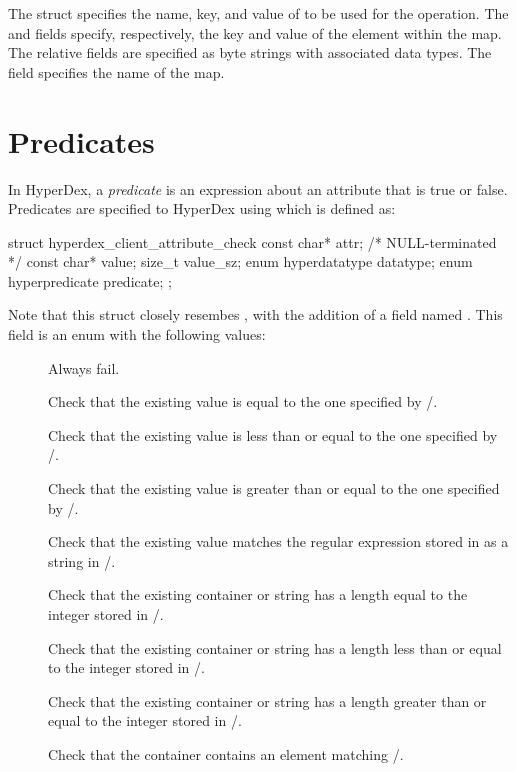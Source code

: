 The struct specifies the name, key, and value of to be used for the operation.
The  and  fields specify, respectively, the key
and value of the element within the map.  The relative fields are specified as
byte strings with associated data types.  The  field specifies the
name of the map.

\section{Predicates}
\label{sec:api:c:client:predicates}

In HyperDex, a {\em predicate} is an expression about an attribute that is true
or false.  Predicates are specified to HyperDex using  which is defined as:

\begin{ccode}
struct hyperdex_client_attribute_check
{
    const char* attr; /* NULL-terminated */
    const char* value;
    size_t value_sz;
    enum hyperdatatype datatype;
    enum hyperpredicate predicate;
};
\end{ccode}

Note that this struct closely resembes , with the addition of a field named
.  This field is an enum with the following values:

\begin{description}
\item[] Always fail.
\item[] Check that the existing value is equal to
    the one specified by /.
\item[] Check that the existing value is less
    than or equal to the one specified by /.
\item[] Check that the existing value is
    greater than or equal to the one specified by /.
\item[] Check that the existing value matches the
    regular expression stored in as a string in /.
\item[] Check that the existing container
    or string has a length equal to the integer stored in
    /.
\item[] Check that the existing
    container or string has a length less than or equal to the integer stored in
    /.
\item[] Check that the existing
    container or string has a length greater than or equal to the integer stored
    in /.
\item[] Check that the container contains an
    element matching /.
\end{description}

